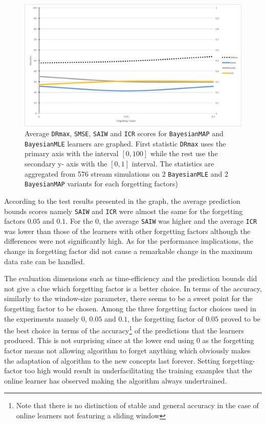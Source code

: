 \begin{figure}[htbp]
  \centering
    \includegraphics[width=\linewidth]{./Figures/bmle_bmap_ff_sweet_pt.pdf}
  \caption{Average \texttt{DRmax}, \texttt{SMSE}, \texttt{SAIW} and \texttt{ICR} scores for \texttt{BayesianMAP} and \texttt{BayesianMLE} learners are graphed. First statistic \texttt{DRmax} uses the primary axis with the interval $[0,100]$ while the rest use the secondary y- axis with the $[0,1]$ interval. The statistics are aggregated from 576 stream simulations on 2 \texttt{BayesianMLE} and 2 \texttt{BayesianMAP} variants for each forgetting factors)}
  \label{fig:bmle_bmap_ff_sweet_pt}
\end{figure}

According to the test results presented in the graph, the average prediction bounds scores namely \texttt{SAIW} and \texttt{ICR} were almost the same for the forgetting factors $0.05$ and $0.1$. For the $0$, the average \texttt{SAIW} was higher and the average \texttt{ICR} was lower than those of the learners with other forgetting factors although the differences were not significantly high. As for the performance implications, the change in forgetting factor did not cause a remarkable change in the maximum data rate can be handled.

The evaluation dimensions such as time-efficiency and the prediction bounds did not give a clue which forgetting factor is a better choice. In terms of the accuracy, similarly to the window-size parameter, there seems to be a sweet point for the forgetting factor to be chosen. Among the three forgetting factor choices used in the experiments namely $0$, $0.05$ and $0.1$, the forgetting factor of $0.05$ proved to be the best choice in terms of the accuracy\footnote{Note that there is no distinction of stable and general accuracy in the case of online learners not featuring a sliding window} of the predictions that the learners produced. This is not surprising since at the lower end using $0$ as the forgetting factor means not allowing algorithm to forget anything which obviously makes the adaptation of algorithm to the new concepts last forever. Setting forgetting-factor too high would result in underfacilitating the training examples that the online learner has observed making the algorithm always undertrained. 

